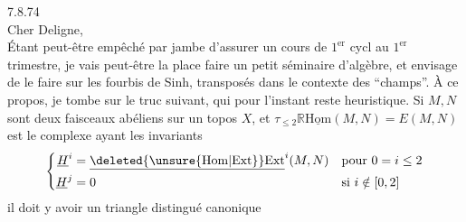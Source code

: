 
  7.8.74\\
Cher Deligne,\\

Étant peut-être empêché par  jambe d'assurer un cours de $1^{\mathrm{er}}$ cycl au $1^{\mathrm{er}}$ trimestre, je vais peut-être  la place faire un petit séminaire d'algèbre, et envisage de le faire sur les fourbis de  Sinh,  transposés dans le contexte des ``champs''. À ce propos, je tombe sur le truc suivant,
qui pour l'instant reste heuristique. Si $M,N$ sont deux faisceaux abéliens sur un topos $X$, et $\tau_{\leq 2}\mathbb{R}\underline{\mathrm{Hom}}(M,N)=E(M,N)$ est le complexe ayant les invariants
\[
\left\{\begin{aligned}
\underline{H}^{i}&=\underline{\deleted{\unsure{\mathrm{Hom}|\mathrm{Ext}}}\mathrm{Ext}}^{i}(M,N) &&\text{pour }0=i\leq 2\\
\underline{H}^{j}&=0 &&\text{si }i\notin[0,2]
\end{aligned}\right.
\]
il doit y avoir un triangle distingué canonique

